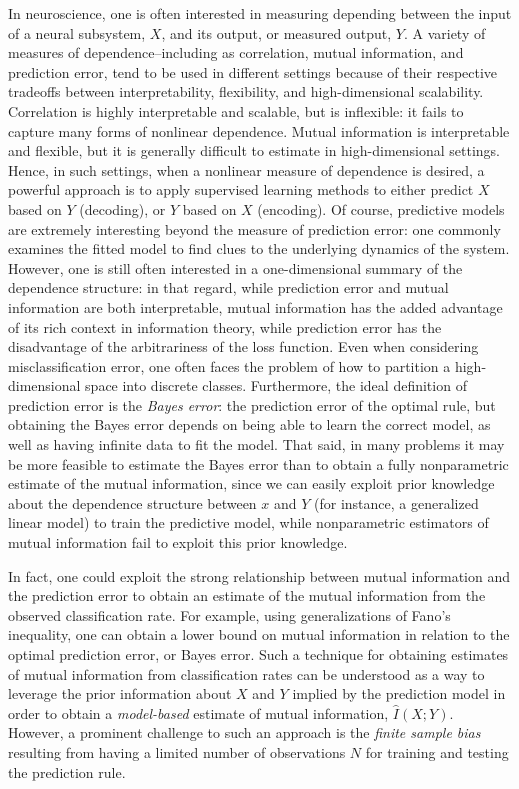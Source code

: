 \documentclass[12pt]{article}
\begin{document}
In neuroscience, one is often interested in measuring depending
between the input of a neural subsystem, $X$, and its output, or
measured output, $Y$.  A variety of measures of dependence--including
as correlation, mutual information, and prediction error, tend to be
used in different settings because of their respective tradeoffs
between interpretability, flexibility, and high-dimensional
scalability.  Correlation is highly interpretable and scalable, but is
inflexible: it fails to capture many forms of nonlinear dependence.
Mutual information is interpretable and flexible, but it is generally
difficult to estimate in high-dimensional settings.  Hence, in such
settings, when a nonlinear measure of dependence is desired, a
powerful approach is to apply supervised learning methods to either
predict $X$ based on $Y$ (decoding), or $Y$ based on $X$ (encoding).
Of course, predictive models are extremely interesting beyond the
measure of prediction error: one commonly examines the fitted model to
find clues to the underlying dynamics of the system.  However, one is
still often interested in a one-dimensional summary of the dependence
structure: in that regard, while prediction error and mutual
information are both interpretable, mutual information has the added
advantage of its rich context in information theory, while prediction
error has the disadvantage of the arbitrariness of the loss function.
Even when considering misclassification error, one often faces the
problem of how to partition a high-dimensional space into discrete
classes.  Furthermore, the ideal definition of prediction error is
the \emph{Bayes error}: the prediction error of the optimal rule, but
obtaining the Bayes error depends on being able to learn the correct
model, as well as having infinite data to fit the model.  That said,
in many problems it may be more feasible to estimate the Bayes error
than to obtain a fully nonparametric estimate of the mutual
information, since we can easily exploit prior knowledge about the
dependence structure between $x$ and $Y$ (for instance, a generalized
linear model) to train the predictive model, while nonparametric
estimators of mutual information fail to exploit this prior knowledge.

In fact, one could exploit the strong relationship between mutual
information and the prediction error to obtain an estimate of the
mutual information from the observed classification rate.  For
example, using generalizations of Fano's inequality, one can obtain a
lower bound on mutual information in relation to the optimal
prediction error, or Bayes error.  Such a technique for obtaining
estimates of mutual information from classification rates can be
understood as a way to leverage the prior information about $X$ and
$Y$ implied by the prediction model in order to obtain
a \emph{model-based} estimate of mutual information, $\hat{I}(X; Y)$.
However, a prominent challenge to such an approach is the \emph{finite
sample bias} resulting from having a limited number of observations
$N$ for training and testing the prediction rule.
\end{document}
